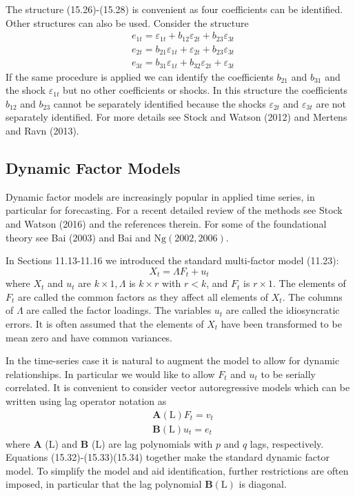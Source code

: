 \documentclass[10pt]{article}
\begin{document}
The structure (15.26)-(15.28) is convenient as four coefficients can be identified. Other structures can also be used. Consider the structure
$$
\begin{aligned}
&e_{1 t}=\varepsilon_{1 t}+b_{12} \varepsilon_{2 t}+b_{23} \varepsilon_{3 t} \\
&e_{2 t}=b_{21} \varepsilon_{1 t}+\varepsilon_{2 t}+b_{23} \varepsilon_{3 t} \\
&e_{3 t}=b_{31} \varepsilon_{1 t}+b_{32} \varepsilon_{2 t}+\varepsilon_{3 t}
\end{aligned}
$$
If the same procedure is applied we can identify the coefficients $b_{21}$ and $b_{31}$ and the shock $\varepsilon_{1 t}$ but no other coefficients or shocks. In this structure the coefficients $b_{12}$ and $b_{23}$ cannot be separately identified because the shocks $\varepsilon_{2 t}$ and $\varepsilon_{3 t}$ are not separately identified. For more details see Stock and Watson (2012) and Mertens and Ravn (2013).

\subsection{Dynamic Factor Models}
Dynamic factor models are increasingly popular in applied time series, in particular for forecasting. For a recent detailed review of the methods see Stock and Watson (2016) and the references therein. For some of the foundational theory see Bai (2003) and Bai and $\mathrm{Ng}(2002,2006)$.

In Sections 11.13-11.16 we introduced the standard multi-factor model (11.23):
$$
X_{t}=\Lambda F_{t}+u_{t}
$$
where $X_{t}$ and $u_{t}$ are $k \times 1, \Lambda$ is $k \times r$ with $r<k$, and $F_{t}$ is $r \times 1$. The elements of $F_{t}$ are called the common factors as they affect all elements of $X_{t}$. The columns of $\Lambda$ are called the factor loadings. The variables $u_{t}$ are called the idiosyncratic errors. It is often assumed that the elements of $X_{t}$ have been transformed to be mean zero and have common variances.

In the time-series case it is natural to augment the model to allow for dynamic relationships. In particular we would like to allow $F_{t}$ and $u_{t}$ to be serially correlated. It is convenient to consider vector autoregressive models which can be written using lag operator notation as
$$
\begin{aligned}
&\boldsymbol{A}(\mathrm{L}) F_{t}=v_{t} \\
&\boldsymbol{B}(\mathrm{L}) u_{t}=e_{t}
\end{aligned}
$$
where $\boldsymbol{A}$ (L) and $\boldsymbol{B}$ (L) are lag polynomials with $p$ and $q$ lags, respectively. Equations (15.32)-(15.33)(15.34) together make the standard dynamic factor model. To simplify the model and aid identification, further restrictions are often imposed, in particular that the lag polynomial $\boldsymbol{B}(\mathrm{L})$ is diagonal.
\end{document}
